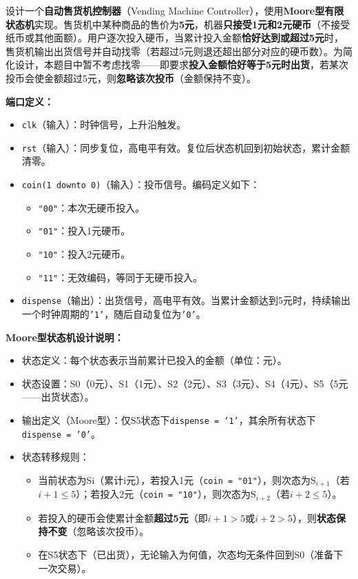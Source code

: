 设计一个\textbf{自动售货机控制器}（Vending Machine Controller），使用\textbf{Moore型有限状态机}实现。售货机中某种商品的售价为\textbf{5元}，机器\textbf{只接受1元和2元硬币}（不接受纸币或其他面额）。用户逐次投入硬币，当累计投入金额\textbf{恰好达到或超过5元}时，售货机输出出货信号并自动找零（若超过5元则退还超出部分对应的硬币数）。为简化设计，本题目中暂不考虑找零——即要求\textbf{投入金额恰好等于5元时出货}，若某次投币会使金额超过5元，则\textbf{忽略该次投币}（金额保持不变）。

\textbf{端口定义：}
\begin{itemize}
  \item \texttt{clk}（输入）：时钟信号，上升沿触发。
  \item \texttt{rst}（输入）：同步复位，高电平有效。复位后状态机回到初始状态，累计金额清零。
  \item \texttt{coin(1~downto~0)}（输入）：投币信号。编码定义如下：
  \begin{itemize}
    \item \texttt{"00"}：本次无硬币投入。
    \item \texttt{"01"}：投入1元硬币。
    \item \texttt{"10"}：投入2元硬币。
    \item \texttt{"11"}：无效编码，等同于无硬币投入。
  \end{itemize}
  \item \texttt{dispense}（输出）：出货信号，高电平有效。当累计金额达到5元时，持续输出一个时钟周期的\texttt{'1'}，随后自动复位为\texttt{'0'}。
\end{itemize}

\textbf{Moore型状态机设计说明：}
\begin{itemize}
  \item 状态定义：每个状态表示当前累计已投入的金额（单位：元）。
  \item 状态设置：S0（0元）、S1（1元）、S2（2元）、S3（3元）、S4（4元）、S5（5元——出货状态）。
  \item 输出定义（Moore型）：仅S5状态下\texttt{dispense = '1'}，其余所有状态下\texttt{dispense = '0'}。
  \item 状态转移规则：
  \begin{itemize}
    \item 当前状态为Si（累计i元），若投入1元（\texttt{coin = "01"}），则次态为S$_{i+1}$（若$i+1 \le 5$）；若投入2元（\texttt{coin = "10"}），则次态为S$_{i+2}$（若$i+2 \le 5$）。
    \item 若投入的硬币会使累计金额\textbf{超过5元}（即$i+1>5$或$i+2>5$），则\textbf{状态保持不变}（忽略该次投币）。
    \item 在S5状态下（已出货），无论输入为何值，次态均无条件回到S0（准备下一次交易）。
  \end{itemize}
\end{itemize}


